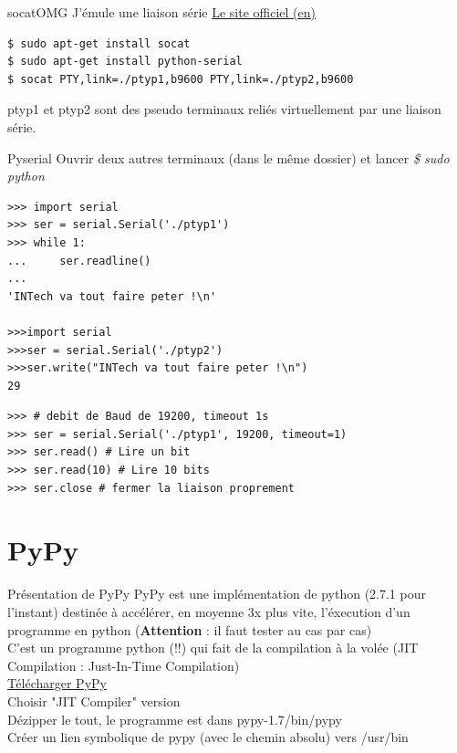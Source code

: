 \documentclass{beamer}
\begin{document}
\begin{frame}[fragile]{socat}{OMG J'émule une liaison série}
\underline{\href{http://pyserial.sourceforge.net/}{Le site officiel (en)}}
\begin{lstlisting}[language=bash]
$ sudo apt-get install socat
$ sudo apt-get install python-serial
$ socat PTY,link=./ptyp1,b9600 PTY,link=./ptyp2,b9600
\end{lstlisting}
ptyp1 et ptyp2 sont des pseudo terminaux reliés virtuellement par une liaison série.\\
\end{frame}

\begin{frame}[fragile]{Pyserial}
Ouvrir deux autres terminaux (dans le même dossier) et lancer \textit{\$ sudo python}
\begin{lstlisting}[basicstyle=\tiny, multicols=2]
>>> import serial
>>> ser = serial.Serial('./ptyp1')
>>> while 1:
...     ser.readline()
...
'INTech va tout faire peter !\n'

>>>import serial
>>>ser = serial.Serial('./ptyp2')
>>>ser.write("INTech va tout faire peter !\n")
29
\end{lstlisting}
\begin{lstlisting}[basicstyle=\tiny]
>>> # debit de Baud de 19200, timeout 1s
>>> ser = serial.Serial('./ptyp1', 19200, timeout=1)
>>> ser.read() # Lire un bit
>>> ser.read(10) # Lire 10 bits
>>> ser.close # fermer la liaison proprement
\end{lstlisting}

\end{frame}

\section{PyPy}

\begin{frame}[fragile]{Présentation de PyPy}
PyPy est une implémentation de python (2.7.1 pour l'instant) destinée à accélérer, en moyenne 3x plus vite, l'éxecution d'un programme en python (\textbf{Attention} : il faut tester au cas par cas)\\
C'est un programme python (!!) qui fait de la compilation à la volée (JIT Compilation : Just-In-Time Compilation)\\
\underline{\href{http://pypy.org/download.html}{Télécharger PyPy}}\\
Choisir "JIT Compiler" version\\
Dézipper le tout, le programme est dans pypy-1.7/bin/pypy\\
Créer un lien symbolique de pypy (avec le chemin absolu) vers /usr/bin
\end{frame}
\end{document}
